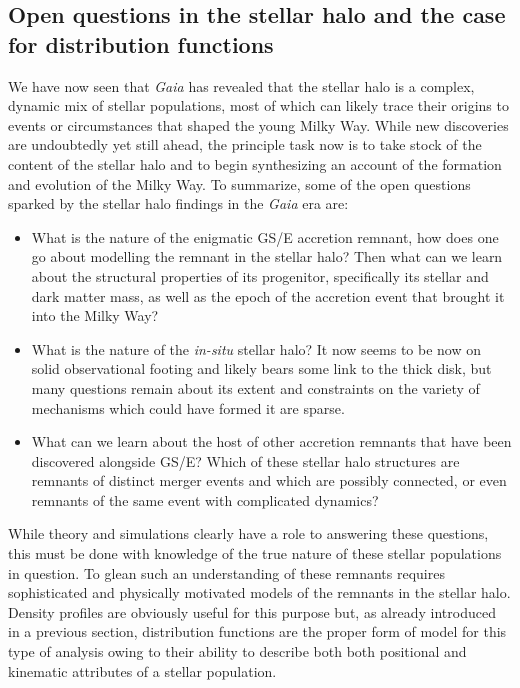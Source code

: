 \subsection{Open questions in the stellar halo and the case for distribution functions}

We have now seen that \textit{Gaia} has revealed that the stellar halo is a complex, dynamic mix of stellar populations, most of which can likely trace their origins to events or circumstances that shaped the young Milky Way. While new discoveries are undoubtedly yet still ahead, the principle task now is to take stock of the content of the stellar halo and to begin synthesizing an account of the formation and evolution of the Milky Way. To summarize, some of the open questions sparked by the stellar halo findings in the \textit{Gaia} era are:

\begin{itemize}
    \item What is the nature of the enigmatic GS/E accretion remnant, how does one go about modelling the remnant in the stellar halo? Then what can we learn about the structural properties of its progenitor, specifically its stellar and dark matter mass, as well as the epoch of the accretion event that brought it into the Milky Way?
    
    \item What is the nature of the \textit{in-situ} stellar halo? It now seems to be now on solid observational footing and likely bears some link to the thick disk, but many questions remain about its extent and constraints on the variety of mechanisms which could have formed it are sparse.
    
    \item What can we learn about the host of other accretion remnants that have been discovered alongside GS/E? Which of these stellar halo structures are remnants of distinct merger events and which are possibly connected, or even remnants of the same event with complicated dynamics?
\end{itemize}

While theory and simulations clearly have a role to answering these questions, this must be done with knowledge of the true nature of these stellar populations in question. To glean such an understanding of these remnants requires sophisticated and physically motivated models of the remnants in the stellar halo. Density profiles are obviously useful for this purpose but, as already introduced in a previous section, distribution functions are the proper form of model for this type of analysis owing to their ability to describe both both positional and kinematic attributes of a stellar population.

